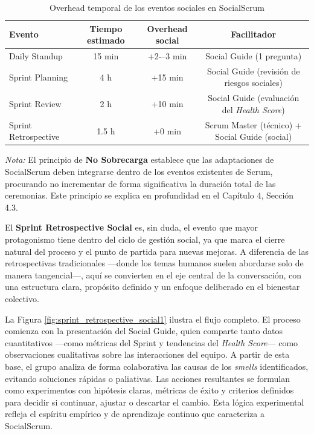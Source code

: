 \begin{table}[!htbp]
    \centering
    \small
    \begin{tabular}{|l|c|c|c|}
        \hline
        \textbf{Evento}      & \textbf{Tiempo estimado} & \textbf{Overhead social} & \textbf{Facilitador}                                \\
        \hline
        Daily Standup        & 15 min                   & +2-–3 min                & Social Guide (1 pregunta)                           \\
        Sprint Planning      & 4 h                      & +15 min                  & Social Guide (revisión de riesgos sociales)         \\
        Sprint Review        & 2 h                      & +10 min                  & Social Guide (evaluación del \textit{Health Score}) \\
        Sprint Retrospective & 1.5 h                    & +0 min                   & Scrum Master (técnico) + Social Guide (social)      \\
        \hline
    \end{tabular}
    \caption{Overhead temporal de los eventos sociales en SocialScrum}
    \label{tab:eventos-tiempo}
\end{table}

\emph{Nota:} El principio de \textbf{No Sobrecarga} establece que las adaptaciones de SocialScrum deben integrarse dentro de los eventos existentes de Scrum, procurando no incrementar de forma significativa la duración total de las ceremonias. Este principio se explica en profundidad en el Capítulo 4, Sección 4.3.

\FloatBarrier

El \textbf{Sprint Retrospective Social} es, sin duda, el evento que mayor protagonismo tiene dentro del ciclo de gestión social, ya que marca el cierre natural del proceso y el punto de partida para nuevas mejoras. A diferencia de las retrospectivas tradicionales —donde los temas humanos suelen abordarse solo de manera tangencial—, aquí se convierten en el eje central de la conversación, con una estructura clara, propósito definido y un enfoque deliberado en el bienestar colectivo.

La Figura \ref{fig:sprint_retrospective_social1} ilustra el flujo completo. El proceso comienza con la presentación del Social Guide, quien comparte tanto datos cuantitativos —como métricas del Sprint y tendencias del \textit{Health Score}— como observaciones cualitativas sobre las interacciones del equipo. A partir de esta base, el grupo analiza de forma colaborativa las causas de los \textit{smells} identificados, evitando soluciones rápidas o paliativas.
Las acciones resultantes se formulan como experimentos con hipótesis claras, métricas de éxito y criterios definidos para decidir si continuar, ajustar o descartar el cambio. Esta lógica experimental refleja el espíritu empírico y de aprendizaje continuo que caracteriza a SocialScrum.

